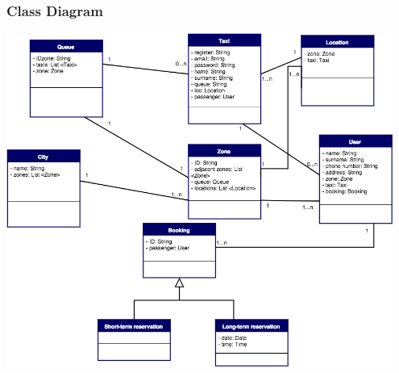 \subsubsection{Class Diagram}
\begin{center}

\includegraphics[width=0.95\textwidth]{./images/ClassDiagram.png}
	\end{center}